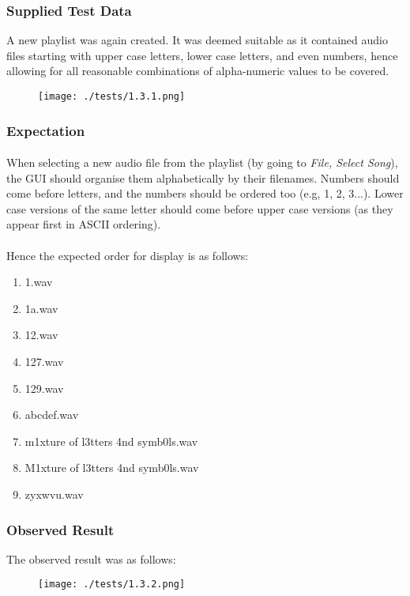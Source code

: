 \subsubsection{Supplied Test Data}
A new playlist was again created. It was deemed suitable as it contained audio files starting with upper case letters, lower case letters, and even numbers, hence allowing for all reasonable combinations of alpha-numeric values to be covered.
\begin{figure}[H]
	\texttt{[image: ./tests/1.3.1.png]}
\end{figure}

\subsubsection{Expectation}
\paragraph{}
When selecting a new audio file from the playlist (by going to \textit{File, Select Song}), the GUI should organise them alphabetically by their filenames. Numbers should come before letters, and the numbers should be ordered too (e.g, 1, 2, 3...). Lower case versions of the same letter should come before upper case versions (as they appear first in ASCII ordering).
\paragraph{}
Hence the expected order for display is as follows:
\begin{enumerate}
	\item 1.wav
	\item 1a.wav
	\item 12.wav
	\item 127.wav
	\item 129.wav
	\item abcdef.wav
	\item m1xture of l3tters 4nd symb0ls.wav
	\item M1xture of l3tters 4nd symb0ls.wav
	\item zyxwvu.wav
\end{enumerate}

\subsubsection{Observed Result}
The observed result was as follows:
\begin{figure}[H]
	\texttt{[image: ./tests/1.3.2.png]}
\end{figure}

